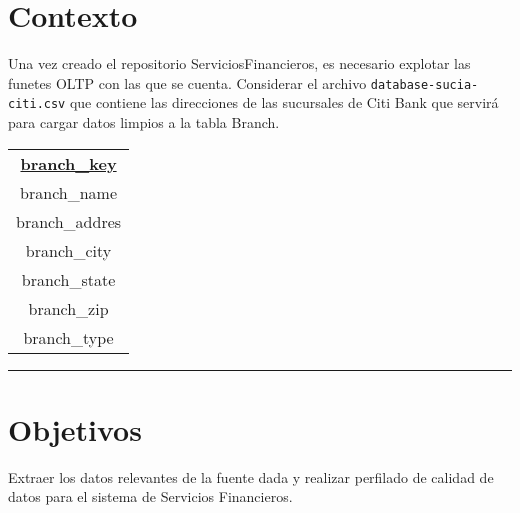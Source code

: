 \section*{Contexto}

Una vez creado el repositorio ServiciosFinancieros, es necesario
explotar las funetes OLTP con las que se cuenta. Considerar el 
archivo \texttt{database-sucia-citi.csv} que contiene las 
direcciones de las sucursales de Citi Bank que servirá para cargar 
datos limpios a la tabla Branch.

\begin{center}
    \begin{tabular}{|c|}
        \hline
        \underline{\textbf{branch\_key}} \\
        branch\_name \\
        branch\_addres \\
        branch\_city \\
        branch\_state \\
        branch\_zip \\
        branch\_type \\
        \hline
    \end{tabular}
\end{center}

\vspace{0.5 cm}
\hrule
\vspace{0.5 cm}

\section*{Objetivos}

Extraer los datos relevantes de la fuente dada y realizar perfilado 
de calidad de datos para el sistema de Servicios Financieros. 
